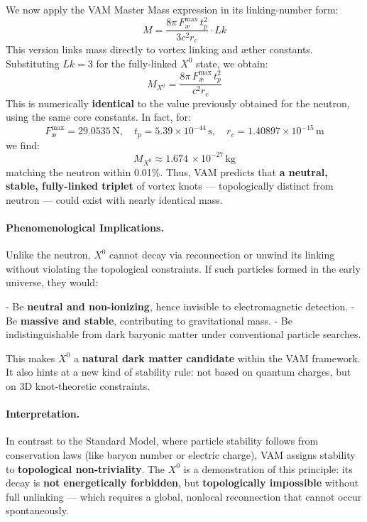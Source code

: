 \documentclass[a4paper,12pt]{article}
\begin{document}
We now apply the VAM Master Mass expression in its linking-number form:
\[
M = \frac{8\pi\, F_{\text{\ae}}^{\max} \, t_p^2}{3 c^2 r_c} \cdot Lk
\]
This version links mass directly to vortex linking and æther constants. Substituting $Lk=3$ for the fully-linked $X^0$ state, we obtain:
\[
M_{X^0} = \frac{8\pi\, F_{\text{\ae}}^{\max} \, t_p^2}{c^2 r_c}
\]
This is numerically \textbf{identical} to the value previously obtained for the neutron, using the same core constants. In fact, for:
\[
F_{\text{\ae}}^{\max} = 29.0535\,\text{N}, \quad t_p = 5.39\times10^{-44}\,\text{s}, \quad r_c = 1.40897\times10^{-15}\,\text{m}
\]
we find:
\[
M_{X^0} \approx 1.674\,\times10^{-27}\,\text{kg}
\]
matching the neutron within 0.01\%. Thus, VAM predicts that \textbf{a neutral, stable, fully-linked triplet} of vortex knots — topologically distinct from neutron — could exist with nearly identical mass.

\paragraph{Phenomenological Implications.}

Unlike the neutron, $X^0$ cannot decay via reconnection or unwind its linking without violating the topological constraints. If such particles formed in the early universe, they would:

- Be \textbf{neutral and non-ionizing}, hence invisible to electromagnetic detection.
- Be \textbf{massive and stable}, contributing to gravitational mass.
- Be indistinguishable from dark baryonic matter under conventional particle searches.

This makes $X^0$ a \textbf{natural dark matter candidate} within the VAM framework. It also hints at a new kind of stability rule: not based on quantum charges, but on 3D knot-theoretic constraints.

\paragraph{Interpretation.}

In contrast to the Standard Model, where particle stability follows from conservation laws (like baryon number or electric charge), VAM assigns stability to \textbf{topological non-triviality}. The $X^0$ is a demonstration of this principle: its decay is \textbf{not energetically forbidden}, but \textbf{topologically impossible} without full unlinking — which requires a global, nonlocal reconnection that cannot occur spontaneously.
\end{document}
